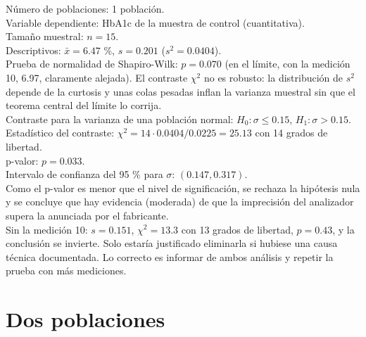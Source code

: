 \documentclass[
  spanish,
  a4paper,
]{scrreport}
\theoremstyle{definition}
\theoremstyle{remark}
\begin{document}
\begin{tcolorbox}[enhanced jigsaw, arc=.35mm, bottomrule=.15mm, bottomtitle=1mm, breakable, colback=white, colbacktitle=quarto-callout-tip-color!10!white, colframe=quarto-callout-tip-color-frame, coltitle=black, left=2mm, leftrule=.75mm, opacityback=0, opacitybacktitle=0.6, rightrule=.15mm, title=\textcolor{quarto-callout-tip-color}{\faLightbulb}\hspace{0.5em}{Solución}, titlerule=0mm, toprule=.15mm, toptitle=1mm]

Número de poblaciones: 1 población.\\
Variable dependiente: HbA1c de la muestra de control (cuantitativa).\\
Tamaño muestral: \(n=15\).\\
Descriptivos: \(\bar x=6.47\) \%, \(s=0.201\) (\(s^2=0.0404\)).\\
Prueba de normalidad de Shapiro-Wilk: \(p=0.070\) (en el límite, con la
medición 10, 6.97, claramente alejada). El contraste \(\chi^2\) no es
robusto: la distribución de \(s^2\) depende de la curtosis y unas colas
pesadas inflan la varianza muestral sin que el teorema central del
límite lo corrija.\\
Contraste para la varianza de una población normal:
\(H_0:\sigma\leq 0.15\), \(H_1:\sigma>0.15\).\\
Estadístico del contraste: \(\chi^2=14\cdot 0.0404/0.0225=25.13\) con 14
grados de libertad.\\
p-valor: \(p=0.033\).\\
Intervalo de confianza del 95 \% para \(\sigma\): \((0.147, 0.317)\).\\
Como el p-valor es menor que el nivel de significación, se rechaza la
hipótesis nula y se concluye que hay evidencia (moderada) de que la
imprecisión del analizador supera la anunciada por el fabricante.\\
Sin la medición 10: \(s=0.151\), \(\chi^2=13.3\) con 13 grados de
libertad, \(p=0.43\), y la conclusión se invierte. Solo estaría
justificado eliminarla si hubiese una causa técnica documentada. Lo
correcto es informar de ambos análisis y repetir la prueba con más
mediciones.

\end{tcolorbox}

\section{Dos poblaciones}\label{dos-poblaciones}
\end{document}
